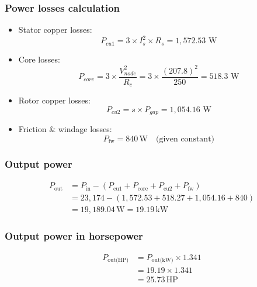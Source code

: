 \documentclass[a4paper,11pt]{IEEEtran}
\begin{document}
\subsubsection{Power losses calculation}
\begin{itemize}
    \item Stator copper losses: 
\begin{equation}
        P_{cu1} = 3 \times I_s^2 \times R_s= 1,572.53 \text{ W} 
\end{equation}

    
    \item Core losses: 
    \begin{equation}
        P_{core} = 3 \times \frac{V_{node}^2}{R_c} = 3 \times \frac{(207.8)^2}{250} = 518.3 \text{ W}
    \end{equation}

    
    \item Rotor copper losses: 
    \begin{equation}
        P_{cu2} = s \times P_{gap} = 1,054.16 \text{ W}
    \end{equation}
    
    \item Friction \& windage losses:
   \begin{equation}
    P_{\text{fw}} = 840\,\text{W} \quad \text{(given constant)}
\end{equation}
\end{itemize}

\subsubsection{Output power}
\begin{equation}
\begin{split}
    P_{\text{out}} &= P_{\text{in}} - (P_{\text{cu1}} + P_{\text{core}} + P_{\text{cu2}} + P_{\text{fw}}) \\
    &= 23{,}174 - (1{,}572.53 + 518.27 + 1{,}054.16 + 840) \\
    &= 19{,}189.04\,\text{W} = 19.19\,\text{kW}
\end{split}
\end{equation}



\subsubsection{Output power in horsepower}
\begin{equation}
\begin{split}
    P_{\text{out(HP)}} &= P_{\text{out(kW)}} \times 1.341 \\
    &= 19.19 \times 1.341 \\
    &= 25.73\,\text{HP}
\end{split}
\end{equation}
\end{document}

